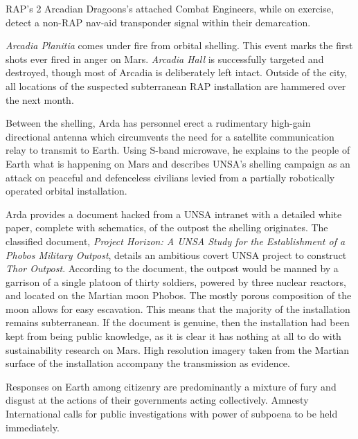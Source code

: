 

RAP's 2 Arcadian Dragoons's attached Combat Engineers, while on exercise, detect a non-RAP nav-aid transponder signal within their demarcation.
\StopTimelineDate

{\it Arcadia Planitia} comes under fire from orbital shelling. This event marks the first shots ever fired in anger on Mars. {\it Arcadia Hall} is successfully targeted and destroyed, though most of Arcadia is deliberately left intact. Outside of the city, all locations of the suspected subterranean RAP installation are hammered over the next month.

Between the shelling, Arda has personnel erect a rudimentary high-gain directional antenna which circumvents the need for a satellite communication relay to transmit to Earth. Using S-band microwave, he explains to the people of Earth what is happening on Mars and describes UNSA's shelling campaign as an attack on peaceful and defenceless civilians levied from a partially robotically operated orbital installation.

Arda provides a document hacked from a UNSA intranet with a detailed white paper, complete with schematics, of the outpost the shelling originates. The classified document, {\it Project Horizon: A UNSA Study for the Establishment of a Phobos Military Outpost}, details an ambitious covert UNSA project to construct {\it Thor Outpost}. According to the document, the outpost would be manned by a garrison of a single platoon of thirty soldiers, powered by three nuclear reactors, and located on the Martian moon Phobos. The mostly porous composition of the moon allows for easy escavation. This means that the majority of the installation remains subterranean. If the document is genuine, then the installation had been kept from being public knowledge, as it is clear it has nothing at all to do with sustainability research on Mars. High resolution imagery taken from the Martian surface of the installation accompany the transmission as evidence.

Responses on Earth among citizenry are predominantly a mixture of fury and disgust at the actions of their governments acting collectively. Amnesty International calls for public investigations with power of subpoena to be held immediately.

